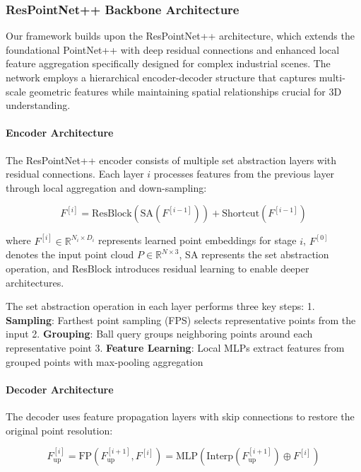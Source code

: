 \documentclass[preprint,12pt]{elsarticle}
\begin{document}
\subsubsection{ResPointNet++ Backbone Architecture}
\label{sec:respointnet_backbone}

Our framework builds upon the ResPointNet++ architecture, which extends the foundational PointNet++ with deep residual connections and enhanced local feature aggregation specifically designed for complex industrial scenes. The network employs a hierarchical encoder-decoder structure that captures multi-scale geometric features while maintaining spatial relationships crucial for 3D understanding.

\paragraph{Encoder Architecture}
The ResPointNet++ encoder consists of multiple set abstraction layers with residual connections. Each layer $i$ processes features from the previous layer through local aggregation and down-sampling:

\begin{equation}
F^{[i]} = \text{ResBlock}(\text{SA}(F^{[i-1]})) + \text{Shortcut}(F^{[i-1]})
\end{equation}

where $F^{[i]} \in \mathbb{R}^{N_i \times D_i}$ represents learned point embeddings for stage $i$, $F^{[0]}$ denotes the input point cloud $P \in \mathbb{R}^{N \times 3}$, SA represents the set abstraction operation, and ResBlock introduces residual learning to enable deeper architectures.

The set abstraction operation in each layer performs three key steps:
1. \textbf{Sampling}: Farthest point sampling (FPS) selects representative points from the input
2. \textbf{Grouping}: Ball query groups neighboring points around each representative point
3. \textbf{Feature Learning}: Local MLPs extract features from grouped points with max-pooling aggregation

\paragraph{Decoder Architecture}
The decoder uses feature propagation layers with skip connections to restore the original point resolution:

\begin{equation}
F_{\text{up}}^{[i]} = \text{FP}(F_{\text{up}}^{[i+1]}, F^{[i]}) = \text{MLP}(\text{Interp}(F_{\text{up}}^{[i+1]}) \oplus F^{[i]})
\end{equation}
\end{document}
